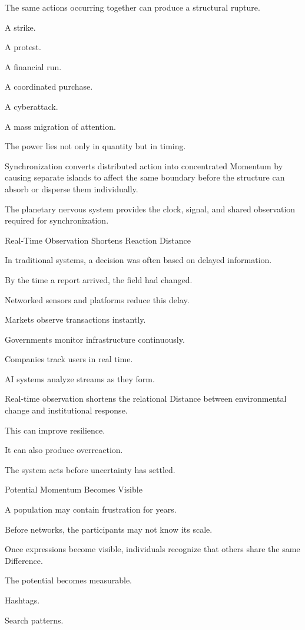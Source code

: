 The same actions occurring together can produce a structural rupture.

A strike.

A protest.

A financial run.

A coordinated purchase.

A cyberattack.

A mass migration of attention.

The power lies not only in quantity but in timing.

Synchronization converts distributed action into concentrated Momentum by causing separate islands to affect the same boundary before the structure can absorb or disperse them individually.

The planetary nervous system provides the clock, signal, and shared observation required for synchronization.

Real-Time Observation Shortens Reaction Distance

In traditional systems, a decision was often based on delayed information.

By the time a report arrived, the field had changed.

Networked sensors and platforms reduce this delay.

Markets observe transactions instantly.

Governments monitor infrastructure continuously.

Companies track users in real time.

AI systems analyze streams as they form.

Real-time observation shortens the relational Distance between environmental change and institutional response.

This can improve resilience.

It can also produce overreaction.

The system acts before uncertainty has settled.

Potential Momentum Becomes Visible

A population may contain frustration for years.

Before networks, the participants may not know its scale.

Once expressions become visible, individuals recognize that others share the same Difference.

The potential becomes measurable.

Hashtags.

Search patterns.

